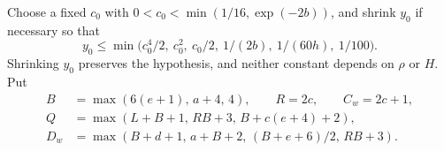 \documentclass[11pt,a4paper]{article}
\theoremstyle{definition}
\theoremstyle{remark}
\numberwithin{equation}{section}
\begin{document}
Choose a fixed \(c_{0}\) with \(0<c_{0}<\min (1/16,\exp (-2b))\), and shrink \(y_{0}\) if necessary so that
\begin{equation}\label{eq:boot-y0}
 y_{0}\le \min \bigl(c_{0}^{4}/2,\ c_{0}^{2},\ c_{0}/2,\ 1/(2b),\ 1/(60h),\ 1/100\bigr).
\end{equation}
Shrinking \(y_{0}\) preserves the hypothesis, and neither constant depends on \(\rho\) or \(H\). Put
\begin{equation}\label{eq:boot-constants}
\begin{aligned}
 B&=\max (6(e+1),\,a+4,\,4),\qquad R=2c,\qquad C_{w}=2c+1,\\
 Q&=\max (L+B+1,\,RB+3,\,B+c(e+4)+2),\\
 D_{w}&=\max (B+d+1,\,a+B+2,\,(B+e+6)/2,\,RB+3).
\end{aligned}
\end{equation}
\end{document}

